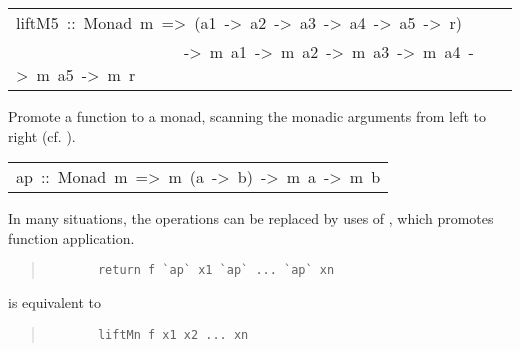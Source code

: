 \begin{haddockdesc}
\item[\begin{tabular}{@{}l}
liftM5\ ::\ Monad\ m\ =>\ (a1\ ->\ a2\ ->\ a3\ ->\ a4\ ->\ a5\ ->\ r)\\\ \ \ \ \ \ \ \ \ \ \ \ \ \ \ \ \ \ \ \ \ ->\ m\ a1\ ->\ m\ a2\ ->\ m\ a3\ ->\ m\ a4\ ->\ m\ a5\ ->\ m\ r
\end{tabular}]\haddockbegindoc
Promote a function to a monad, scanning the monadic arguments from
 left to right (cf. ).
\par

\end{haddockdesc}
\begin{haddockdesc}
\item[\begin{tabular}{@{}l}
ap\ ::\ Monad\ m\ =>\ m\ (a\ ->\ b)\ ->\ m\ a\ ->\ m\ b
\end{tabular}]\haddockbegindoc
In many situations, the  operations can be replaced by uses of
, which promotes function application. 
\par
\begin{quote}
{\haddockverb\begin{verbatim}
       return f `ap` x1 `ap` ... `ap` xn
\end{verbatim}}
\end{quote}
is equivalent to 
\par
\begin{quote}
{\haddockverb\begin{verbatim}
       liftMn f x1 x2 ... xn
\end{verbatim}}
\end{quote}

\end{haddockdesc}